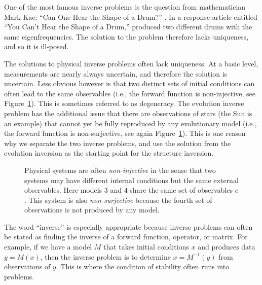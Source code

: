 One of the most famous inverse problems is the question from mathematician Mark Kac: ``Can One Hear the Shape of a Drum?'' \citep{10.2307/2313748}. 
In a response article entitled ``You Can't Hear the Shape of a Drum,'' \citet{10.2307/29775597} produced two different drums with the same eigenfrequencies. 
The solution to the problem therefore lacks uniqueness, and so it is ill-posed. 

The solutions to physical inverse problems often lack uniqueness. 
At a basic level, measurements are nearly always uncertain, and therefore the solution is uncertain. 
Less obvious however is that two distinct sets of initial conditions can often lead to the same observables (i.e., the forward function is non-injective, see Figure~\ref{fig:non-injective}). 
This is sometimes referred to as degeneracy. 
The evolution inverse problem has the additional issue that there are observations of stars (the Sun is an example) that cannot yet be fully reproduced by any evolutionary model (i.e., the forward function is non-surjective, see again Figure~\ref{fig:non-injective}). 
This is one reason why we separate the two inverse problems, and use the solution from the evolution inversion as the starting point for the structure inversion. 

\begin{figure} 
    \centering 
     
    \caption[Non-injective and non-surjective functions]{Physical systems are often \emph{non-injective} in the sense that two systems may have different internal conditions but the same external observables. 
    Here models $3$ and $4$ share the same set of observables $c$. 
    This system is also \emph{non-surjective} because the fourth set of observations is not produced by any model. 
        \label{fig:non-injective}}
\end{figure}

The word ``inverse'' is especially appropriate because inverse problems can often be stated as finding the inverse of a forward function, operator, or matrix. 
For example, if we have a model $M$ that takes initial conditions $x$ and produces data ${y=M(x)}$, then the inverse problem is to determine ${x=M^{-1}(y)}$ from observations of $y$. 
This is where the condition of stability often runs into problems. 

